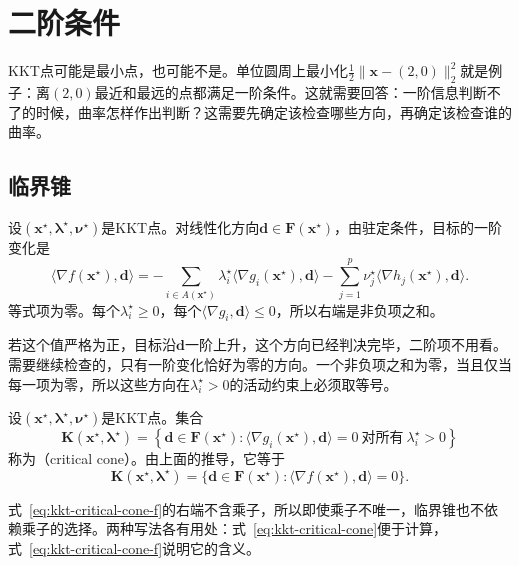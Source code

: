 \section{二阶条件}
\label{sec:kkt-second-order}

KKT点可能是最小点，也可能不是。单位圆周上最小化$\frac12\lVert\bm{x}-(2,0)\rVert_2^2$就是例子：离$(2,0)$最近和最远的点都满足一阶条件。这就需要回答：一阶信息判断不了的时候，曲率怎样作出判断？这需要先确定该检查哪些方向，再确定该检查谁的曲率。

\subsection{临界锥}
\label{sec:kkt-critical-cone}

设$(\bm{x}^\star,\bm{\lambda}^\star,\bm{\nu}^\star)$是KKT点。对线性化方向$\bm{d}\in\bm{F}(\bm{x}^\star)$，由驻定条件，目标的一阶变化是
\[
 \langle\nabla f(\bm{x}^\star),\bm{d}\rangle=-\sum_{i\in A(\bm{x}^\star)}\lambda_i^\star\langle\nabla g_i(\bm{x}^\star),\bm{d}\rangle-\sum_{j=1}^p\nu_j^\star\langle\nabla h_j(\bm{x}^\star),\bm{d}\rangle.
\]
等式项为零。每个$\lambda_i^\star\geq0$，每个$\langle\nabla g_i,\bm{d}\rangle\leq0$，所以右端是非负项之和。

若这个值严格为正，目标沿$\bm{d}$一阶上升，这个方向已经判决完毕，二阶项不用看。需要继续检查的，只有一阶变化恰好为零的方向。一个非负项之和为零，当且仅当每一项为零，所以这些方向在$\lambda_i^\star>0$的活动约束上必须取等号。

\begin{definition}[临界锥]
\label{def:kkt-critical-cone}
设$(\bm{x}^\star,\bm{\lambda}^\star,\bm{\nu}^\star)$是KKT点。集合
\begin{equation}
 \bm{K}(\bm{x}^\star,\bm{\lambda}^\star)=\left\{\bm{d}\in\bm{F}(\bm{x}^\star):
 \langle\nabla g_i(\bm{x}^\star),\bm{d}\rangle=0\ \text{对所有}\ \lambda_i^\star>0
 \right\}
 \label{eq:kkt-critical-cone}
\end{equation}
称为（critical cone）。由上面的推导，它等于
\begin{equation}
 \bm{K}(\bm{x}^\star,\bm{\lambda}^\star)=\{\bm{d}\in\bm{F}(\bm{x}^\star):\langle\nabla f(\bm{x}^\star),\bm{d}\rangle=0\}.
 \label{eq:kkt-critical-cone-f}
\end{equation}
\end{definition}

式~\eqref{eq:kkt-critical-cone-f}的右端不含乘子，所以即使乘子不唯一，临界锥也不依赖乘子的选择。两种写法各有用处：式~\eqref{eq:kkt-critical-cone}便于计算，式~\eqref{eq:kkt-critical-cone-f}说明它的含义。


